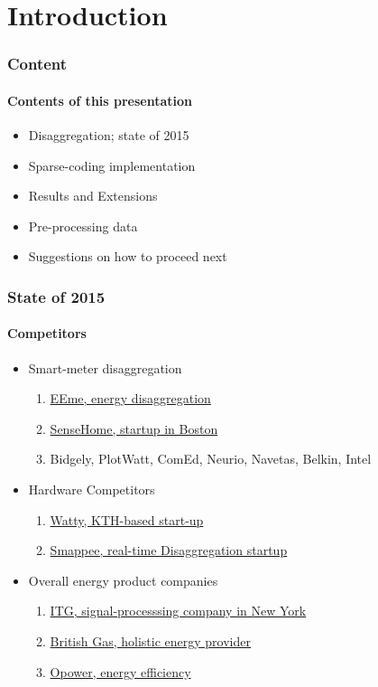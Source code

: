 \documentclass[gray]{beamer}
\begin{document}
\section{Introduction}
\begin{frame}
	\frametitle{Content}
	\framesubtitle{Contents of this presentation}
	\begin{itemize}
		\item{Disaggregation; state of 2015}
		\item{Sparse-coding implementation}
		\item{Results and Extensions}
		\item{Pre-processing data}
		\item{Suggestions on how to proceed next}
	\end{itemize}
\end{frame}
\begin{frame}
	\frametitle{State of 2015}
	\framesubtitle{Competitors}
	\begin{itemize}
		\item{Smart-meter disaggregation}
		\begin{enumerate}
			\item{\href{http://www.energyefficiency.me/}{EEme, energy disaggregation}}
			\item{\href{http://sensehome.com/}{SenseHome, startup in Boston}}
			\item{Bidgely, PlotWatt, ComEd, Neurio, Navetas, Belkin, Intel}
		\end{enumerate}
		\item{ Hardware Competitors}
		\begin{enumerate}
			\item{\href{http://watty.io/}{Watty, KTH-based start-up}}
			\item{\href{http://www.smappee.com/be_en/}{Smappee, real-time Disaggregation startup}}
		\end{enumerate}
		\item{Overall energy product companies}
		\begin{enumerate}
			\item{\href{http://www.itgfirm.com/}{ITG, signal-processsing company in New York}}
			\item{\href{http://www.britishgas.co.uk/}{British Gas, holistic energy provider}}
			\item{\href{http://www.opower.com/solutions/energy-efficiency}{Opower, energy efficiency}}
		\end{enumerate}
	\end{itemize}
\end{frame}
\end{document}
